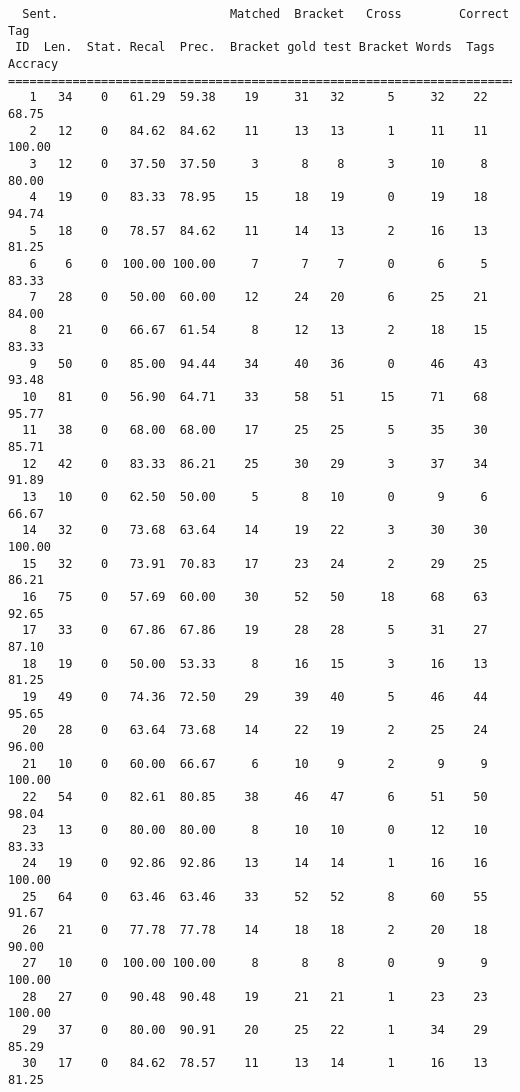 \scriptsize
\begin{verbatim}
  Sent.                        Matched  Bracket   Cross        Correct Tag
 ID  Len.  Stat. Recal  Prec.  Bracket gold test Bracket Words  Tags Accracy
============================================================================
   1   34    0   61.29  59.38    19     31   32      5     32    22    68.75
   2   12    0   84.62  84.62    11     13   13      1     11    11   100.00
   3   12    0   37.50  37.50     3      8    8      3     10     8    80.00
   4   19    0   83.33  78.95    15     18   19      0     19    18    94.74
   5   18    0   78.57  84.62    11     14   13      2     16    13    81.25
   6    6    0  100.00 100.00     7      7    7      0      6     5    83.33
   7   28    0   50.00  60.00    12     24   20      6     25    21    84.00
   8   21    0   66.67  61.54     8     12   13      2     18    15    83.33
   9   50    0   85.00  94.44    34     40   36      0     46    43    93.48
  10   81    0   56.90  64.71    33     58   51     15     71    68    95.77
  11   38    0   68.00  68.00    17     25   25      5     35    30    85.71
  12   42    0   83.33  86.21    25     30   29      3     37    34    91.89
  13   10    0   62.50  50.00     5      8   10      0      9     6    66.67
  14   32    0   73.68  63.64    14     19   22      3     30    30   100.00
  15   32    0   73.91  70.83    17     23   24      2     29    25    86.21
  16   75    0   57.69  60.00    30     52   50     18     68    63    92.65
  17   33    0   67.86  67.86    19     28   28      5     31    27    87.10
  18   19    0   50.00  53.33     8     16   15      3     16    13    81.25
  19   49    0   74.36  72.50    29     39   40      5     46    44    95.65
  20   28    0   63.64  73.68    14     22   19      2     25    24    96.00
  21   10    0   60.00  66.67     6     10    9      2      9     9   100.00
  22   54    0   82.61  80.85    38     46   47      6     51    50    98.04
  23   13    0   80.00  80.00     8     10   10      0     12    10    83.33
  24   19    0   92.86  92.86    13     14   14      1     16    16   100.00
  25   64    0   63.46  63.46    33     52   52      8     60    55    91.67
  26   21    0   77.78  77.78    14     18   18      2     20    18    90.00
  27   10    0  100.00 100.00     8      8    8      0      9     9   100.00
  28   27    0   90.48  90.48    19     21   21      1     23    23   100.00
  29   37    0   80.00  90.91    20     25   22      1     34    29    85.29
  30   17    0   84.62  78.57    11     13   14      1     16    13    81.25

\end{verbatim}
